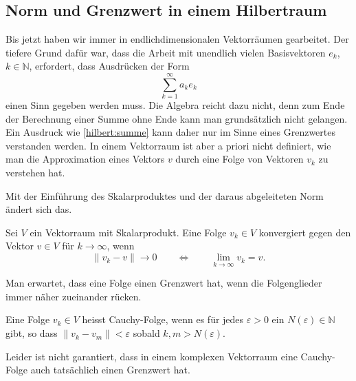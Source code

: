 \subsection{Norm und Grenzwert in einem Hilbertraum}
Bis jetzt haben wir immer in endlichdimensionalen Vektorräumen gearbeitet.
Der tiefere Grund dafür war, dass die Arbeit mit unendlich vielen Basisvektoren
$e_k$, $k\in\mathbb N$, erfordert, dass Ausdrücken der Form
\begin{equation}
\sum_{k=1}^\infty a_k e_k
\label{hilbert:summe}
\end{equation}
einen Sinn gegeben werden muss.
Die Algebra reicht dazu nicht, denn zum Ende der Berechnung einer Summe
ohne Ende kann man grundsätzlich nicht gelangen.
Ein Ausdruck wie \eqref{hilbert:summe} kann daher nur im Sinne eines
Grenzwertes verstanden werden.
In einem Vektorraum ist aber a priori nicht definiert, wie man die
Approximation eines Vektors $v$ durch eine Folge von Vektoren $v_k$ zu
verstehen hat.

Mit der Einführung des Skalarproduktes und der daraus abgeleiteten Norm
ändert sich das.
\begin{definition}
Sei $V$ ein Vektorraum mit Skalarprodukt.
Eine Folge $v_k\in V$ konvergiert gegen den Vektor $v\in V$ für $k\to\infty$,
wenn
\[
\| v_k - v\| \to  0 
\qquad\Leftrightarrow\qquad
\lim_{k\to\infty} v_k = v.
\]
\end{definition}

Man erwartet, dass eine Folge einen Grenzwert hat, wenn die Folgenglieder
immer näher zu\-ei\-nan\-der rücken.

\begin{definition}
Eine Folge $v_k\in V$ heisst Cauchy-Folge, wenn es für jedes $\varepsilon > 0$
ein $N(\varepsilon)\in\mathbb N$ gibt, so dass
$\|v_k - v_m\| < \varepsilon$
sobald $k,m>N(\varepsilon)$.
\end{definition}

Leider ist nicht garantiert, dass in einem komplexen Vektorraum eine
Cauchy-Folge auch tatsächlich einen Grenzwert hat.

